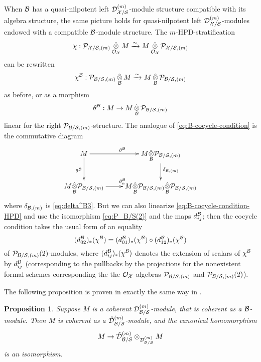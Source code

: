 \documentclass{article}
\theoremstyle{change}
\newtheorem{prop}[subsubsection]{Proposition}
\numberwithin{equation}{subsubsection}
\newcommand{\demobox}{\vrule height6pt width6pt depth0pt}
\newcommand{\nodemo}{\unskip\nobreak\hfil\qquad
\demobox\parfillskip=0pt\par}
\newcommand{\ctensu}[1]{\underset{{#1}}{\hat\otimes}}
\begin{document}
When ${\cal B}$ has a quasi-nilpotent left ${{\cal D}}^{({m})}_{{\cal X}/{\cal S}}$-module
structure compatible with its algebra structure, the same picture
holds for quasi-nilpotent left ${{\cal D}}^{({m})}_{{\cal X}/{\cal S}}$-modules endowed
with a compatible ${\cal B}$-module structure. The $m$-HPD-stratification
\begin{displaymath}
  \chi:{\cal P}_{{\cal X}/{\cal S},(m)}\mathop{\hat\otimes}_{{\cal O}_{\cal X}}M\xrightarrow{\sim}
  M\mathop{\hat\otimes}_{{\cal O}_{\cal X}}{\cal P}_{{\cal X}/{\cal S},(m)}  
\end{displaymath}
can be rewritten
\begin{equation}
  \label{eq:B-compatible-HPD-stratification}
  \chi^{\cal B}:{\cal P}_{{\cal B}/{\cal S},(m)}\mathop{\hat\otimes}_{\cal B} M\xrightarrow{\sim}
  M\mathop{\hat\otimes}_{\cal B}{\cal P}_{{\cal B}/{\cal S},(m)}    
\end{equation}
as before, or as a morphism
\begin{equation}
  \label{eq:B-compatible-HPD-stratification2}
  \theta^{\cal B}:M\to M\mathop{\hat\otimes}_{\cal B}{\cal P}_{{\cal B}/{\cal S},(m)}  
\end{equation}
linear for the right ${\cal P}_{{\cal B}/{\cal S},(m)}$-structure. The analogue of
\ref{eq:B-cocycle-condition} is the commutative diagram
\begin{equation}
  \label{eq:B-cocycle-condition-HPD}
  \xymatrix{
    M\ar[r]^{\theta^\cB}\ar[d]_{\theta^\cB}
    &M\ctensu\cB\cP_{\cB/\cS,(m)}\ar[d]^{\delta_{\cB,(m)}}\\
    M\ctensu\cB\cP_{\cB/\cS,(m)}
    \ar[r]^{\theta^\cB_n}
    &M\ctensu\cB\cP_{\cB/\cS,(m)}\ctensu\cB\cP_{\cB/\cS,(m)}
  }
\end{equation}
where $\delta_{{\cal B},(m)}$ is \ref{eq:delta^B3}. But we can also
linearize \ref{eq:B-cocycle-condition-HPD} and use the isomorphism 
\ref{eq:P_B/S(2)} and the maps $d^{\cal B}_{ij}$; then the cocycle
condition takes the usual form of an equality
\begin{equation}
  \label{eq:B-compatible-cocycle-condition}
  (d^{\cal B}_{02})_*(\chi^{\cal B})
  =(d^{\cal B}_{01})_*(\chi^{\cal B})\circ (d^{\cal B}_{12})_*(\chi^{\cal B})
\end{equation}
of ${\cal P}_{{\cal B}/{\cal S},(m)}(2)$-modules, where $(d^{\cal B}_{ij})_*(\chi^{\cal B})$
denotes the extension of scalars of $\chi^{\cal B}$ by $d^{\cal B}_{ij}$
(corresponding to the pullbacks by the projections for the nonexistent
formal schemes corresponding the the ${\cal O}_{\cal X}$-algebras
${\cal P}_{{\cal B}/{\cal S},(m)}$ and ${\cal P}_{{\cal B}/{\cal S},(m)}(2)$).

The following proposition is proven in exactly the same way in
\cite[Prop. 3.1.3]{berthelot:1990}. 

\begin{prop}\label{prop:Dm-and-Dmhat-coherent}
  Suppose $M$ is a coherent ${{\cal D}}^{({m})}_{{\cal B}/{\cal S}}$-module, that is
  coherent as a ${\cal B}$-module. Then $M$ is coherent as a
  ${\hat{\cal D}}^{({m})}_{{\cal B}/{\cal S}}$-module, and the canonical homomorphism
  \begin{displaymath}
    M\to{\hat{\cal D}}^{({m})}_{{\cal B}/{\cal S}}\otimes_{{{\cal D}}^{({m})}_{{\cal B}/{\cal S}}}M
  \end{displaymath}
  is an isomorphism. \nodemo
\end{prop}
\end{document}
